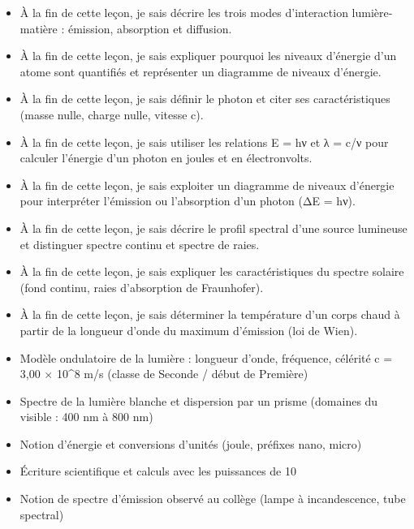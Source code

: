 \documentclass[11pt]{article}
\begin{document}
\begin{objectifs}
\begin{itemize}
\item À la fin de cette leçon, je sais décrire les trois modes d'interaction lumière-matière : émission, absorption et diffusion.
\item À la fin de cette leçon, je sais expliquer pourquoi les niveaux d'énergie d'un atome sont quantifiés et représenter un diagramme de niveaux d'énergie.
\item À la fin de cette leçon, je sais définir le photon et citer ses caractéristiques (masse nulle, charge nulle, vitesse c).
\item À la fin de cette leçon, je sais utiliser les relations E = hν et λ = c/ν pour calculer l'énergie d'un photon en joules et en électronvolts.
\item À la fin de cette leçon, je sais exploiter un diagramme de niveaux d'énergie pour interpréter l'émission ou l'absorption d'un photon (ΔE = hν).
\item À la fin de cette leçon, je sais décrire le profil spectral d'une source lumineuse et distinguer spectre continu et spectre de raies.
\item À la fin de cette leçon, je sais expliquer les caractéristiques du spectre solaire (fond continu, raies d'absorption de Fraunhofer).
\item À la fin de cette leçon, je sais déterminer la température d'un corps chaud à partir de la longueur d'onde du maximum d'émission (loi de Wien).
\end{itemize}
\end{objectifs}

\begin{prerequis}
\begin{itemize}
\item Modèle ondulatoire de la lumière : longueur d'onde, fréquence, célérité c = 3,00 × 10\^{}8 m/s (classe de Seconde / début de Première)
\item Spectre de la lumière blanche et dispersion par un prisme (domaines du visible : 400 nm à 800 nm)
\item Notion d'énergie et conversions d'unités (joule, préfixes nano, micro)
\item Écriture scientifique et calculs avec les puissances de 10
\item Notion de spectre d'émission observé au collège (lampe à incandescence, tube spectral)
\end{itemize}
\end{prerequis}
\end{document}
